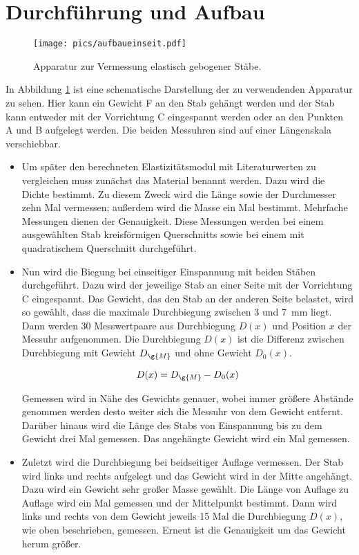 \section{Durchführung und Aufbau}
\label{sec:Durchführung}

\begin{figure}[h]
  \centering
  \texttt{[image: pics/aufbaueinseit.pdf]}
  \caption{Apparatur zur Vermessung elastisch gebogener Stäbe\cite{anleitung}.}
  \label{fig:aufbau}
\end{figure}

In Abbildung \ref{fig:aufbau} ist eine schematische Darstellung der zu
verwendenden Apparatur zu sehen. Hier kann ein Gewicht F an den Stab gehängt
werden und der Stab kann entweder mit der Vorrichtung C eingespannt werden oder
an den Punkten A und B aufgelegt werden. Die beiden Messuhren sind auf einer
Längenskala verschiebbar.

\begin{itemize}
  \item Um später den berechneten Elastizitätsmodul mit Literaturwerten zu
  vergleichen muss zunächst das Material benannt werden.
  Dazu wird die Dichte bestimmt. Zu diesem Zweck wird die Länge sowie der
  Durchmesser zehn Mal vermessen; außerdem wird die Masse ein Mal bestimmt.
  Mehrfache Messungen dienen der Genauigkeit.
  Diese Messungen werden bei einem ausgewählten Stab kreisförmigen
  Querschnitts sowie bei einem mit quadratischem Querschnitt durchgeführt.

  \item Nun wird die Biegung bei einseitiger Einspannung mit beiden
  Stäben durchgeführt. Dazu wird der jeweilige Stab an einer Seite mit der
  Vorrichtung C eingespannt. Das Gewicht, das den Stab an der anderen
  Seite belastet, wird so gewählt, dass die maximale Durchbiegung zwischen
  3 und \SI{7}{\milli\meter} liegt.
  Dann werden 30 Messwertpaare aus Durchbiegung $D(x)$ und Position $x$ der Messuhr
  aufgenommen. Die Durchbiegung $D(x)$ ist die Differenz zwischen
  Durchbiegung mit Gewicht $D_{\g{M}}$ und ohne Gewicht $D_0(x)$.

  \begin{equation*}
    D(x) = D_{\g{M}} - D_0(x)
  \end{equation*}

  Gemessen wird in Nähe des Gewichts genauer, wobei immer größere Abstände
  genommen werden desto weiter sich die Messuhr von dem Gewicht entfernt.
  Darüber hinaus wird die Länge des Stabs von Einspannung bis zu dem
  Gewicht drei Mal gemessen. Das angehängte Gewicht wird ein Mal gemessen.

  \item Zuletzt wird die Durchbiegung bei beidseitiger Auflage vermessen.
  Der Stab wird links und rechts aufgelegt und das Gewicht wird in der Mitte
  angehängt. Dazu wird ein Gewicht sehr großer Masse gewählt. Die Länge
  von Auflage zu Auflage wird ein Mal gemessen und der Mittelpunkt
  bestimmt. Dann wird links und rechts von dem Gewicht jeweils 15 Mal
  die Durchbiegung $D(x)$, wie oben beschrieben, gemessen. Erneut ist
  die Genauigkeit um das Gewicht herum größer.


\end{itemize}
